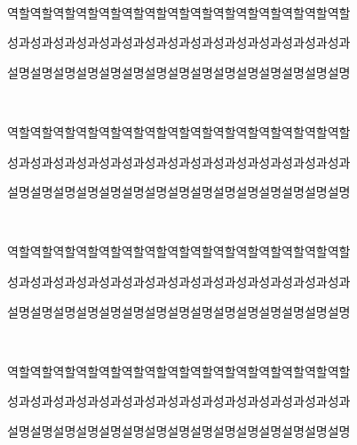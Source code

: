 \documentclass[a4paper]{MagicalCV}
\begin{document}
\begin{minipage}[t]{0.66\textwidth}
 \\
\vspace{\topsep} %
\begin{tightemize}
\item 역할역할역할역할역할역할역할역할역할역할역할역할역할역할역할
\item 성과성과성과성과성과성과성과성과성과성과성과성과성과성과성과
\item 설명설명설명설명설명설명설명설명설명설명설명설명설명설명설명
\end{tightemize}
\sectionsep

 \\
\vspace{\topsep} %
\begin{tightemize}
\item 역할역할역할역할역할역할역할역할역할역할역할역할역할역할역할
\item 성과성과성과성과성과성과성과성과성과성과성과성과성과성과성과
\item 설명설명설명설명설명설명설명설명설명설명설명설명설명설명설명
\end{tightemize}
\sectionsep


 \\
\vspace{\topsep} %
\begin{tightemize}
\item 역할역할역할역할역할역할역할역할역할역할역할역할역할역할역할
\item 성과성과성과성과성과성과성과성과성과성과성과성과성과성과성과
\item 설명설명설명설명설명설명설명설명설명설명설명설명설명설명설명
\end{tightemize}
\sectionsep

 \\
\vspace{\topsep} %
\begin{tightemize}
\item 역할역할역할역할역할역할역할역할역할역할역할역할역할역할역할
\item 성과성과성과성과성과성과성과성과성과성과성과성과성과성과성과
\item 설명설명설명설명설명설명설명설명설명설명설명설명설명설명설명
\end{tightemize}
\sectionsep
\end{minipage} 
\end{document}
